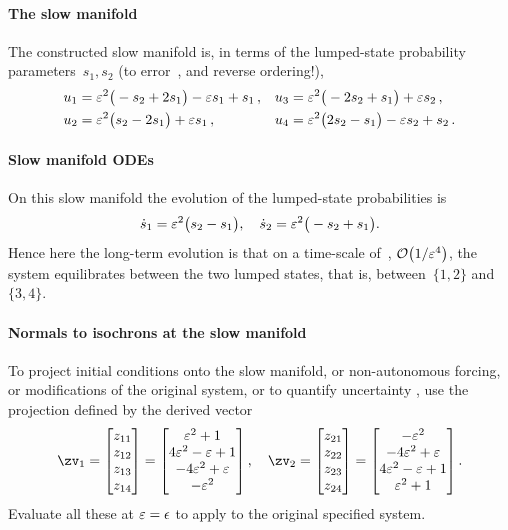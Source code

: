 \paragraph{The slow manifold} 
The constructed slow manifold is, in terms of the
lumped-state probability parameters~\(s_1,s_2\) (to
error~, and reverse ordering!), 
\begin{align*}&
u_{1}=\varepsilon^{2} \big(-s_{2}+2 s_{1}\big)-\varepsilon  s_{1}+s_{1}\,, &&
u_{3}=\varepsilon^{2} \big(-2 s_{2}+s_{1}\big)+\varepsilon  s_{2}\,, \\&
u_{2}=\varepsilon^{2} \big(s_{2}-2 s_{1}\big)+\varepsilon  s_{1}\,, &&
u_{4}=\varepsilon^{2} \big(2 s_{2}-s_{1}\big)-\varepsilon  s_{2}+s_{2}\,.
\end{align*}

\paragraph{Slow manifold ODEs} 
On this slow manifold the evolution of the lumped-state
probabilities is
\begin{equation*}
\dot s_{1}=\varepsilon^{2} \big(s_{2}-s_{1}\big),\quad
\dot s_{2}=\varepsilon^{2} \big(-s_{2}+s_{1}\big).
\end{equation*}
Hence here the long-term evolution is that on a time-scale
of~, \(\Ord{1/\eps^4}\), the system
equilibrates between the two lumped states, that is,
between~\(\{1,2\}\) and~\(\{3,4\}\).


\paragraph{Normals to isochrons at the slow manifold}
To project initial conditions onto the slow manifold, or
non-autonomous forcing, or modifications of the original
system, or to quantify uncertainty \cite[]{Roberts89b,
Roberts97b}, use the projection defined by the derived
vector
\begin{equation*}
\zv_1=\begin{bmatrix}z_{11}\\z_{12}\\z_{13}\\z_{14}\end{bmatrix}
=\begin{bmatrix}
\eps^{2}+1\\
4 \eps^{2}-\eps +1\\
-4 \eps^{2}+\eps \\
-\eps^{2}
\end{bmatrix},\quad
\zv_2=\begin{bmatrix}z_{21}\\z_{22}\\z_{23}\\z_{24}\end{bmatrix}
=\begin{bmatrix}
-\eps^{2}\\
-4 \eps^{2}+\eps \\
4 \eps^{2}-\eps +1\\
\eps^{2}+1
\end{bmatrix}
.
\end{equation*}
Evaluate all these at \(\varepsilon=\epsilon\) to apply to the
original specified system.



